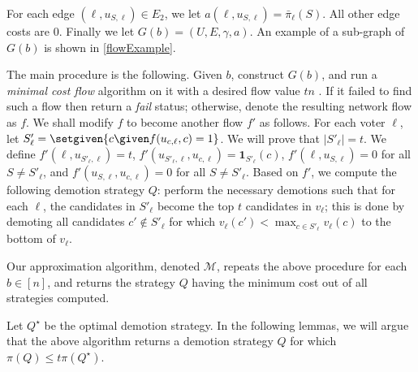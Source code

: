 \documentclass[letterpaper]{article} %
\newcommand{\indic}{\mathbf{1}}
\newcommand{\CMCF}{\emph{minimal cost flow}}
\newcommand{\abs}[1]{\lvert{#1}\rvert}
\begin{document}
For each edge $(\ell, u_{S,\ell}) \in E_2$, we let $a(\ell, u_{S,\ell}) = \bar{\pi}_{\ell}(S)$. All other edge costs are $0$. Finally we let $G(b)=(U,E,\gamma,a)$. An example of a sub-graph of $G(b)$ is shown in \cref{flowExample}.


The main procedure is the following. Given $b$, construct $G(b)$, and run a \CMCF{} algorithm on it with a desired flow value $tn$ \cite{edmonds1972theoretical}. If it failed to find such a flow then return a \emph{fail} status; otherwise, denote the resulting network flow as $f$. We shall modify $f$ to become another flow $f'$ as follows.
For each voter $\ell$, let $S'_{\ell} = \setgiven{c \given f(u_{c,\ell},c)=1}$. We will prove that $\abs{S'_{\ell}}=t$. We define $f'(\ell, u_{S'_{\ell},\ell})=t$, $f'(u_{S'_{\ell},\ell}, u_{c,\ell})=\indic_{S'_{\ell}}(c)$, $f'(\ell,u_{S,\ell})=0$ for all $S \neq S'_{\ell}$, and $f'(u_{S,\ell}, u_{c,\ell})=0$ for all $S \neq S'_{\ell}$. 
Based on $f'$, we compute the following demotion strategy $Q$:  perform the necessary demotions such that for each $\ell$, the candidates in $S'_{\ell}$ become the top $t$ candidates in $v_\ell$; this is done by demoting all candidates $c' \notin S'_{\ell}$ for which $v_\ell(c') < \max_{c \in S'_{\ell}} v_\ell(c)$ to the bottom of $v_\ell$. 

Our approximation algorithm, denoted $\mathcal{M}$, repeats the above procedure for each $b \in [n]$, and returns the strategy $Q$ having the minimum cost out of all strategies computed.

Let $Q^{\star}$ be the optimal demotion strategy. In the following lemmas, we will argue that the above algorithm returns a demotion strategy $Q$ for which $\pi(Q) \leq t\pi(Q^{\star})$.
\end{document}

